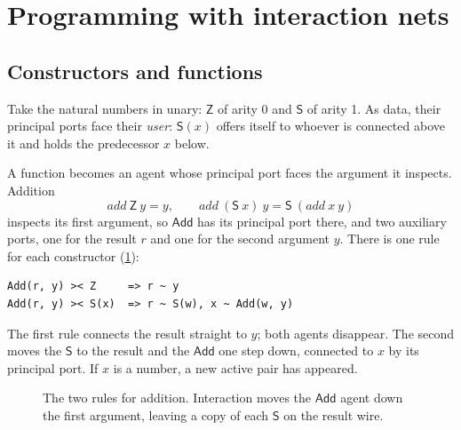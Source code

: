 \documentclass[11pt,a4paper]{article}
\newcommand{\ag}[1]{\mathsf{#1}}
\newcommand{\Z}{\ag{Z}}
\newcommand{\Sa}{\ag{S}}
\newcommand{\Add}{\ag{Add}}
\newcommand{\Up}[5][]{%
  \node[agent,#1] (#2) at (#3) {#4};
  \coordinate (#2-0) at (#2.corner 1);
  \ifnum#5=1 \coordinate (#2-1) at ($(#2.corner 2)!.5!(#2.corner 3)$);\fi
  \ifnum#5=2 \coordinate (#2-1) at ($(#2.corner 2)!.27!(#2.corner 3)$);
    \coordinate (#2-2) at ($(#2.corner 2)!.73!(#2.corner 3)$);\fi
  \node[pp] at (#2-0) {};}
\newcommand{\Down}[5][]{%
  \node[agent,regular polygon rotate=180,#1] (#2) at (#3) {#4};
  \coordinate (#2-0) at (#2.corner 1);
  \ifnum#5=1 \coordinate (#2-1) at ($(#2.corner 3)!.5!(#2.corner 2)$);\fi
  \ifnum#5=2 \coordinate (#2-1) at ($(#2.corner 3)!.27!(#2.corner 2)$);
    \coordinate (#2-2) at ($(#2.corner 3)!.73!(#2.corner 2)$);\fi
  \node[pp] at (#2-0) {};}
\newcommand{\ruleto}[1]{\node[font=\Large] at (#1) {$\Rightarrow$};}
\theoremstyle{definition}
\theoremstyle{plain}
\begin{document}
\section{Programming with interaction nets}\label{sec:programming}

\subsection{Constructors and functions}

Take the natural numbers in unary: $\Z$ of arity 0 and $\Sa$ of arity 1. As
data, their principal ports face their \emph{user}: $\Sa(x)$ offers itself to
whoever is connected above it and holds the predecessor $x$ below.

A function becomes an agent whose principal port faces the argument it
inspects. Addition
\[
  \mathit{add}\ \Z\ y = y, \qquad
  \mathit{add}\ (\Sa\ x)\ y = \Sa\ (\mathit{add}\ x\ y)
\]
inspects its first argument, so $\Add$ has its principal port there, and two
auxiliary ports, one for the result $r$ and one for the second argument $y$.
There is one rule for each constructor (\cref{fig:add}):
\begin{lstlisting}
Add(r, y) >< Z     => r ~ y
Add(r, y) >< S(x)  => r ~ S(w), x ~ Add(w, y)
\end{lstlisting}
The first rule connects the result straight to $y$; both agents disappear.
The second moves the $\Sa$ to the result and the $\Add$ one step down,
connected to $x$ by its principal port. If $x$ is a number, a new active pair
has appeared.

\begin{figure}[t]
\centering
{}
\hspace{1.6cm}
\caption{The two rules for addition. Interaction moves the $\Add$ agent down
the first argument, leaving a copy of each $\Sa$ on the result wire.}
\label{fig:add}
\end{figure}
\end{document}
